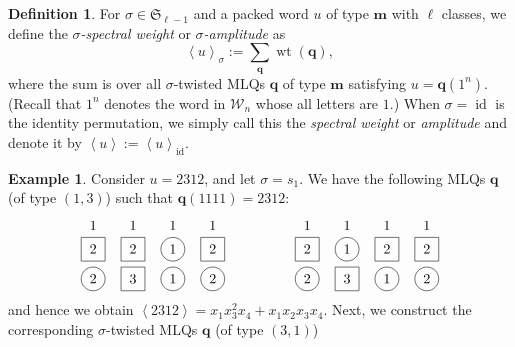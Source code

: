 \documentclass[reqno]{amsart}
\newcommand{\0}{\phantom{c}}
\newcommand{\swt}[1]{\left\langle #1 \right\rangle} %
\newcommand{\SymGp}[1]{\mathfrak{S}_{#1}} %
\DeclareMathOperator{\wt}{wt} %
\DeclareMathOperator{\id}{id} %
\newcommand{\mm}{\mathbf{m}}
\newcommand{\qq}{\mathbf{q}}
\newcommand{\mcW}{\mathcal{W}}
\let\sumnonlimits\sum
\renewcommand{\sum}{\sumnonlimits\limits}
\newcommand{\tup}[1]{\left( #1 \right)}
\newcommand{\defn}[1]{{\color{darkred}\emph{#1}}} %
\theoremstyle{plain}
\theoremstyle{definition}
\newtheorem{dfn}[thm]{Definition}
\newtheorem{example}[thm]{Example}
\numberwithin{equation}{section}
\begin{document}
\begin{dfn}
For $\sigma \in \SymGp{\ell-1}$ and a packed word $u$ of type $\mm$ with $\ell$ classes, we define the \defn{$\sigma$-spectral weight} or \defn{$\sigma$-amplitude} as
\[
  \swt{u}_{\sigma} := \sum_{\qq} \wt(\qq),
\]
where the sum is over all $\sigma$-twisted MLQs $\qq$ of type $\mm$ satisfying $u = \qq(1^n)$.
(Recall that $1^n$ denotes the word in $\mcW_n$ whose all letters are $1$.)
When $\sigma = \id$ is the identity permutation, we simply call this the \defn{spectral weight} or \defn{amplitude} and denote it by $\swt{u} := \swt{u}_{\id}$.
\end{dfn}

\begin{example}
\label{ex:spectral_weight_example}
Consider $u = 2312$, and let $\sigma = s_1$.
We have the following MLQs $\qq$ (of type $\tup{1,3}$) such that $\qq(1111) = 2312$:
\[
\begin{tikzpicture}[baseline=-30]
  \def\ll{0.75}   %
  \foreach \i in {3} { \draw (\i,\ll*-1) circle (0.3); }
  \foreach \i in {1,2,4} { \draw (\i-.3,\ll*-1 -.3) rectangle +(0.6,+0.6); }
  \foreach \i in {1,3,4} { \draw (\i,\ll*-2) circle (0.3); }
  \foreach \i in {2} { \draw (\i-.3,\ll*-2 -.3) rectangle +(0.6,+0.6); }
  \foreach \i in {1,2,3,4} { \node at (\i, \ll*0-.15) {$1$}; }
  \foreach \i in {3} { \node at (\i, \ll*-1) {$1$}; }
  \foreach \i in {1,2,4} { \node at (\i, \ll*-1) {$2$}; }
  \foreach \i in {3} { \node at (\i, \ll*-2) {$1$}; }
  \foreach \i in {1,4} { \node at (\i, \ll*-2) {$2$}; }
  \foreach \i in {2} { \node at (\i, \ll*-2) {$3$}; }
\end{tikzpicture}
\hspace{50pt}
\begin{tikzpicture}[baseline=-30]
  \def\ll{0.75}   %
  \foreach \i in {2} { \draw (\i,\ll*-1) circle (0.3); }
  \foreach \i in {1,3,4} { \draw (\i-.3,\ll*-1 -.3) rectangle +(0.6,+0.6); }
  \foreach \i in {1,3,4} { \draw (\i,\ll*-2) circle (0.3); }
  \foreach \i in {2} { \draw (\i-.3,\ll*-2 -.3) rectangle +(0.6,+0.6); }
  \foreach \i in {1,2,3,4} { \node at (\i, \ll*0-.15) {$1$}; }
  \foreach \i in {2} { \node at (\i, \ll*-1) {$1$}; }
  \foreach \i in {1,3,4} { \node at (\i, \ll*-1) {$2$}; }
  \foreach \i in {3} { \node at (\i, \ll*-2) {$1$}; }
  \foreach \i in {1,4} { \node at (\i, \ll*-2) {$2$}; }
  \foreach \i in {2} { \node at (\i, \ll*-2) {$3$}; }
\end{tikzpicture}
\]
and hence we obtain $\swt{2312} = x_1 x_3^2 x_4 + x_1 x_2 x_3 x_4$.
Next, we construct the corresponding $\sigma$-twisted MLQs $\qq$ (of type $\tup{3,1}$)

\end{example}
\end{document}
